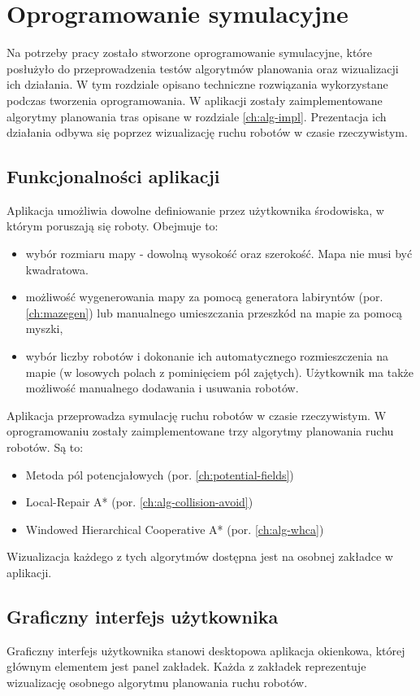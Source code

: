 \chapter{Oprogramowanie symulacyjne}
\label{ch:simulation-app}

Na potrzeby pracy zostało stworzone oprogramowanie symulacyjne, które posłużyło do przeprowadzenia testów algorytmów planowania oraz wizualizacji ich działania.
W tym rozdziale opisano techniczne rozwiązania wykorzystane podczas tworzenia oprogramowania.
W aplikacji zostały zaimplementowane algorytmy planowania tras opisane w rozdziale \ref{ch:alg-impl}.
Prezentacja ich działania odbywa się poprzez wizualizację ruchu robotów w czasie rzeczywistym. 

\section{Funkcjonalności aplikacji}
Aplikacja umożliwia dowolne definiowanie przez użytkownika środowiska, w którym poruszają się roboty. Obejmuje to:
\begin{itemize}
	\item wybór rozmiaru mapy - dowolną wysokość oraz szerokość. Mapa nie musi być kwadratowa.
	\item możliwość wygenerowania mapy za pomocą generatora labiryntów (por. \ref{ch:mazegen}) lub manualnego umieszczania przeszkód na mapie za pomocą myszki,
	\item wybór liczby robotów i dokonanie ich automatycznego rozmieszczenia na mapie (w losowych polach z pominięciem pól zajętych). Użytkownik ma także możliwość manualnego dodawania i usuwania robotów.
\end{itemize}

Aplikacja przeprowadza symulację ruchu robotów w czasie rzeczywistym. W oprogramowaniu zostały zaimplementowane trzy algorytmy planowania ruchu robotów. Są to:
\begin{itemize}
	\item Metoda pól potencjałowych (por. \ref{ch:potential-fields})
	\item Local-Repair A* (por. \ref{ch:alg-collision-avoid})
	\item Windowed Hierarchical Cooperative A* (por. \ref{ch:alg-whca})
\end{itemize}
Wizualizacja każdego z tych algorytmów dostępna jest na osobnej zakładce w aplikacji.

\section{Graficzny interfejs użytkownika}
Graficzny interfejs użytkownika stanowi desktopowa aplikacja okienkowa, której głównym elementem jest panel zakładek. Każda z zakładek reprezentuje wizualizację osobnego algorytmu planowania ruchu robotów.


